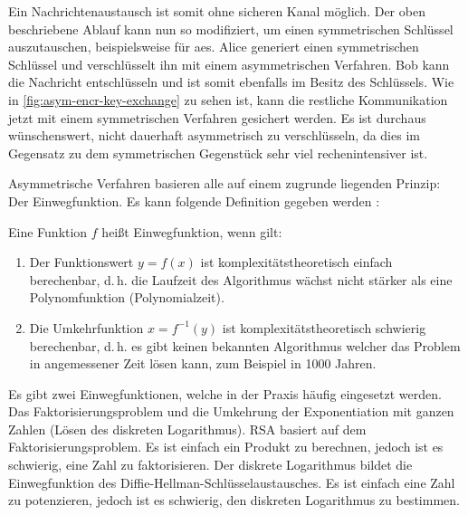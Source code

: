 

\noindent
Ein Nachrichtenaustausch ist somit ohne sicheren Kanal möglich. Der oben beschriebene
Ablauf kann nun so modifiziert, um einen symmetrischen Schlüssel auszutauschen, beispielsweise
für \acs{aes}. Alice generiert einen symmetrischen Schlüssel und verschlüsselt ihn mit einem
asymmetrischen Verfahren. Bob kann die Nachricht entschlüsseln und ist somit ebenfalls
im Besitz des Schlüssels. Wie in \autoref{fig:asym-encr-key-exchange} zu sehen ist,
kann die restliche Kommunikation jetzt mit einem symmetrischen
Verfahren gesichert werden. Es ist durchaus wünschenswert, nicht dauerhaft asymmetrisch
zu verschlüsseln, da dies im Gegensatz zu dem symmetrischen Gegenstück sehr viel
rechenintensiver ist.
\newpage



\noindent
Asymmetrische Verfahren basieren alle auf einem zugrunde liegenden Prinzip:
Der Einwegfunktion. Es kann folgende
Definition gegeben werden \parencite[153]{BOOK:crypto}:

\begin{definition}[Einwegfunktion]
  Eine Funktion $f$ heißt Einwegfunktion, wenn gilt:
  \begin{enumerate}
    \item Der Funktionswert $y = f(x)$ ist komplexitätstheoretisch einfach berechenbar,
          d.\,h. die Laufzeit des Algorithmus wächst
          nicht stärker als eine Polynomfunktion (Polynomialzeit).
    \item Die Umkehrfunktion $x = f^{-1}(y)$ ist komplexitätstheoretisch schwierig berechenbar,
          d.\,h. es gibt keinen bekannten Algorithmus welcher das Problem in angemessener
          Zeit lösen kann, zum Beispiel in 1000 Jahren.
  \end{enumerate}
\end{definition}

\noindent
Es gibt zwei Einwegfunktionen, welche in der Praxis häufig eingesetzt werden.
Das Faktorisierungsproblem und die Umkehrung der Exponentiation mit ganzen Zahlen
(Lösen des diskreten Logarithmus).
RSA basiert auf dem Faktorisierungsproblem.
Es ist einfach ein Produkt zu berechnen, jedoch ist es schwierig, eine Zahl zu
faktorisieren.
Der diskrete Logarithmus bildet die Einwegfunktion des
Diffie-Hellman-Schlüsselaustausches.
Es ist einfach eine Zahl zu potenzieren, jedoch ist es schwierig,
den diskreten Logarithmus zu bestimmen.

